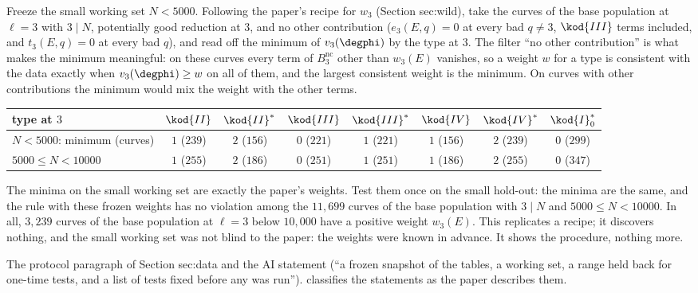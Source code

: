 \begin{sloppypar}
\begin{example}\label{ex:computation:toy-protocol}
Freeze the small working set $N<5000$. Following the paper's recipe for $w_3$ (Section sec:wild), take the curves of the base population at $\ell=3$
with $3\mid N$, potentially good reduction at $3$, and no other contribution ($e_3(E,q)=0$ at every bad $q\ne3$, $\kod{III}$ terms included, and $t_3(E,q)=0$
at every bad $q$), and read off the minimum of $v_3(\degphi)$ by the type at $3$. The filter ``no other contribution'' is what makes the minimum
meaningful: on these curves every term of $B^{\mathrm{nc}}_3$ other than $w_3(E)$ vanishes, so a weight $w$ for a type is consistent with the data exactly
when $v_3(\degphi)\ge w$ on all of them, and the largest consistent weight is the minimum. On curves with other contributions the minimum would
mix the weight with the other terms.
\begin{center}\small
\begin{tabular}{lccccccc}
\toprule
type at $3$ & $\kod{II}$ & $\kod{II}^*$ & $\kod{III}$ & $\kod{III}^*$ & $\kod{IV}$ & $\kod{IV}^*$ & $\kod{I}_0^*$\\
\midrule
$N<5000$: minimum (curves) & $1$ ($239$) & $2$ ($156$) & $0$ ($221$) & $1$ ($221$) & $1$ ($156$) & $2$ ($239$) & $0$ ($299$)\\
$5000\le N<10000$ & $1$ ($255$) & $2$ ($186$) & $0$ ($251$) & $1$ ($251$) & $1$ ($186$) & $2$ ($255$) & $0$ ($347$)\\
\bottomrule
\end{tabular}
\end{center}
The minima on the small working set are exactly the paper's weights. Test them once on the small hold-out: the minima are the same, and the
rule with these frozen weights has no violation among the $11{,}699$ curves of the base population with $3\mid N$ and $5000\le N<10000$. In all,
$3{,}239$ curves of the base population at $\ell=3$ below $10{,}000$ have a positive weight $w_3(E)$. This replicates a recipe; it discovers nothing,
and the small working set was not blind to the paper: the weights were known in advance. It shows the procedure, nothing more.
\end{example}

\begin{paperlink}\label{pl:computation:protocol}
The protocol paragraph of Section sec:data and the AI statement (``a frozen snapshot of the tables, a working set, a range held back for
one-time tests, and a list of tests fixed before any was run'').  classifies the statements as the
paper describes them.
\end{paperlink}


\end{sloppypar}
